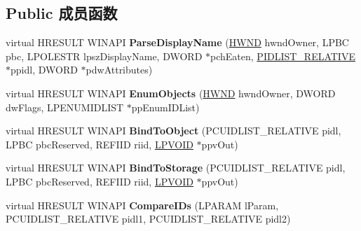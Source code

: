 \subsection*{Public 成员函数}
\begin{DoxyCompactItemize}
\item 
\mbox{\label{class_c_control_panel_folder_a0fa21dc6e089cbea442dfdec3f9de38c}} 
virtual H\+R\+E\+S\+U\+LT W\+I\+N\+A\+PI {\bfseries Parse\+Display\+Name} (\hyperlink{interfacevoid}{H\+W\+ND} hwnd\+Owner, L\+P\+BC pbc, L\+P\+O\+L\+E\+S\+TR lpsz\+Display\+Name, D\+W\+O\+RD $\ast$pch\+Eaten, \hyperlink{struct___i_t_e_m_i_d_l_i_s_t___r_e_l_a_t_i_v_e}{P\+I\+D\+L\+I\+S\+T\+\_\+\+R\+E\+L\+A\+T\+I\+VE} $\ast$ppidl, D\+W\+O\+RD $\ast$pdw\+Attributes)
\item 
\mbox{\label{class_c_control_panel_folder_a77dd4e29afc6df1c2c1ae35156c881e9}} 
virtual H\+R\+E\+S\+U\+LT W\+I\+N\+A\+PI {\bfseries Enum\+Objects} (\hyperlink{interfacevoid}{H\+W\+ND} hwnd\+Owner, D\+W\+O\+RD dw\+Flags, L\+P\+E\+N\+U\+M\+I\+D\+L\+I\+ST $\ast$pp\+Enum\+I\+D\+List)
\item 
\mbox{\label{class_c_control_panel_folder_aef4a7dde7e9a1fe45976b3732b4096a7}} 
virtual H\+R\+E\+S\+U\+LT W\+I\+N\+A\+PI {\bfseries Bind\+To\+Object} (P\+C\+U\+I\+D\+L\+I\+S\+T\+\_\+\+R\+E\+L\+A\+T\+I\+VE pidl, L\+P\+BC pbc\+Reserved, R\+E\+F\+I\+ID riid, \hyperlink{interfacevoid}{L\+P\+V\+O\+ID} $\ast$ppv\+Out)
\item 
\mbox{\label{class_c_control_panel_folder_acce62faa8efd1362160719f58832fe08}} 
virtual H\+R\+E\+S\+U\+LT W\+I\+N\+A\+PI {\bfseries Bind\+To\+Storage} (P\+C\+U\+I\+D\+L\+I\+S\+T\+\_\+\+R\+E\+L\+A\+T\+I\+VE pidl, L\+P\+BC pbc\+Reserved, R\+E\+F\+I\+ID riid, \hyperlink{interfacevoid}{L\+P\+V\+O\+ID} $\ast$ppv\+Out)
\item 
\mbox{\label{class_c_control_panel_folder_a14ae0307da5ca4059fbf9cdccd11d64c}} 
virtual H\+R\+E\+S\+U\+LT W\+I\+N\+A\+PI {\bfseries Compare\+I\+Ds} (L\+P\+A\+R\+AM l\+Param, P\+C\+U\+I\+D\+L\+I\+S\+T\+\_\+\+R\+E\+L\+A\+T\+I\+VE pidl1, P\+C\+U\+I\+D\+L\+I\+S\+T\+\_\+\+R\+E\+L\+A\+T\+I\+VE pidl2)
\item 
\mbox{\label{class_c_control_panel_folder_a8a11219caa3bbaea15a2192ff25faaba}} 

\end{DoxyCompactItemize}
